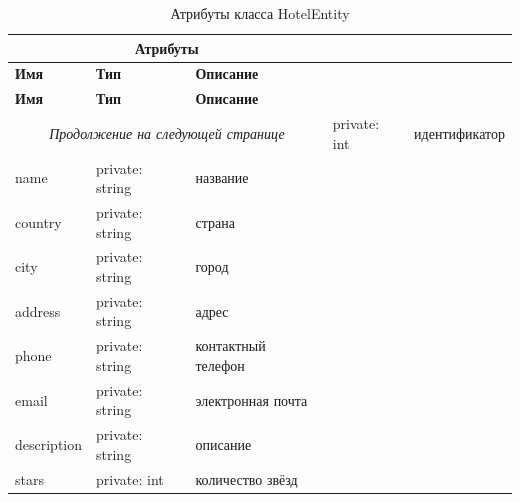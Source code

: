 \begin{longtable}{| p{3cm} | p{5cm} | p{8cm} |}
	\caption{Атрибуты класса HotelEntity}
	\label{tbl:hotel-entity} \\
	\hline
	
	\multicolumn{3}{|c|}{\textbf{Атрибуты}} \\
	\hline
	
	\textbf{Имя} & \textbf{Тип} & \textbf{Описание} \\
	\hline
	\endfirsthead
	
	\hline
	\textbf{Имя} & \textbf{Тип} & \textbf{Описание} \\
	\hline
	\endhead
	
	\hline
	\multicolumn{3}{c}{\textit{Продолжение на следующей странице}}
	\endfoot
	\hline
	\endlastfoot
	
	id
	&
	private: int
	&
	идентификатор \\
	\hline
	
	name
	&
	private: string
	&
	название \\
	\hline
	
	country
	&
	private: string
	&
	страна \\
	\hline
	
	city
	&
	private: string
	&
	город \\
	\hline
	
	address
	&
	private: string
	&
	адрес \\
	\hline
	
	phone
	&
	private: string
	&
	контактный телефон \\
	\hline
	
	email
	&
	private: string
	&
	электронная почта \\
	\hline
	
	description
	&
	private: string
	&
	описание \\
	\hline
	
	stars
	&
	private: int
	&
	количество звёзд \\
\end{longtable}

